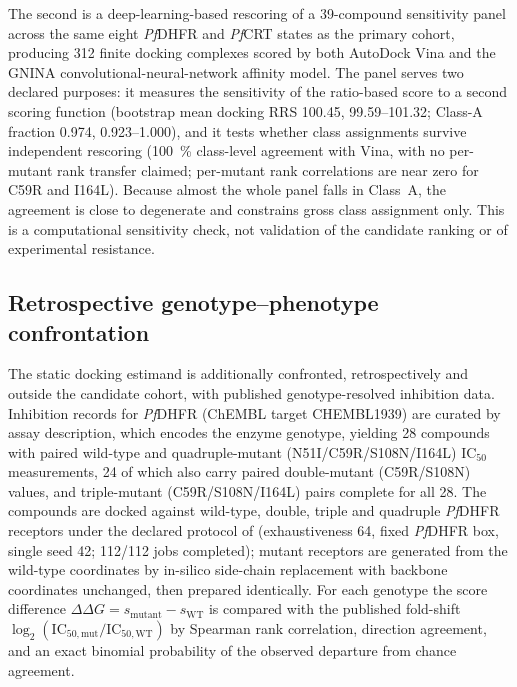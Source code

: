 The second is a deep-learning-based rescoring of a \num{39}-compound sensitivity panel across the same eight \emph{Pf}DHFR and \emph{Pf}CRT states as the primary cohort, producing \num{312} finite docking complexes scored by both AutoDock Vina and the GNINA convolutional-neural-network affinity model. The panel serves two declared purposes: it measures the sensitivity of the ratio-based score to a second scoring function (bootstrap mean docking RRS \num{100.45}, \numrange{99.59}{101.32}; Class-A fraction \num{0.974}, \numrange{0.923}{1.000}), and it tests whether class assignments survive independent rescoring (\qty{100}{\percent} class-level agreement with Vina, with no per-mutant rank transfer claimed; per-mutant rank correlations are near zero for C59R and I164L). Because almost the whole panel falls in Class~A, the agreement is close to degenerate and constrains gross class assignment only. This is a computational sensitivity check, not validation of the candidate ranking or of experimental resistance.

\subsection{Retrospective genotype--phenotype confrontation}

The static docking estimand is additionally confronted, retrospectively and outside the candidate cohort, with published genotype-resolved inhibition data. Inhibition records for \emph{Pf}DHFR (ChEMBL target CHEMBL1939) are curated by assay description, which encodes the enzyme genotype, yielding \num{28} compounds with paired wild-type and quadruple-mutant (N51I/C59R/S108N/I164L) IC$_{50}$ measurements, \num{24} of which also carry paired double-mutant (C59R/S108N) values, and triple-mutant (C59R/S108N/I164L) pairs complete for all \num{28}. The compounds are docked against wild-type, double, triple and quadruple \emph{Pf}DHFR receptors under the declared protocol of  (exhaustiveness \num{64}, fixed \emph{Pf}DHFR box, single seed \num{42}; \num{112}/\num{112} jobs completed); mutant receptors are generated from the wild-type coordinates by in-silico side-chain replacement with backbone coordinates unchanged, then prepared identically. For each genotype the score difference $\Delta\Delta G = s_{\mathrm{mutant}} - s_{\mathrm{WT}}$ is compared with the published fold-shift $\log_2(\mathrm{IC}_{50,\mathrm{mut}}/\mathrm{IC}_{50,\mathrm{WT}})$ by Spearman rank correlation, direction agreement, and an exact binomial probability of the observed departure from chance agreement.

